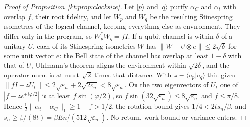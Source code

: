 \begin{proof}[Proof of Proposition~\ref{kt:prop:clocksize}]
Let $|p\rangle$ and $|q\rangle$ purify $\alpha_C$ and $\alpha_t$ with overlap $f$, their root fidelity, and let $W_p$ and $W_q$ be the resulting Stinespring isometries of the logical channel, keeping everything else as environment. They differ only in the program, so $W_p^*W_q=fI$. If a qubit channel is within $\delta$ of a unitary $U$, each of its Stinespring isometries $W$ has $\|W-U\otimes e\|\le2\sqrt\delta$ for some unit vector $e$: the Bell state of the channel has overlap at least $1-\delta$ with that of $U$, Uhlmann's theorem aligns the environment within $\sqrt{2\delta}$, and the operator norm is at most $\sqrt2$ times that distance. With $z=\langle e_p|e_q\rangle$ this gives $\|fI-zU_t\|\le2\sqrt{\varepsilon_n}+2\sqrt{2\varepsilon_n}<8\sqrt{\varepsilon_n}$. On the two eigenvectors of $U_t$ one of $|f-ze^{\pm i\varphi/2}|$ is at least $f\sin(\varphi/2)$, so $f\sin(32\sqrt{\varepsilon_n})\le8\sqrt{\varepsilon_n}$ and $f\le\pi/8$. Hence $\frac12\|\alpha_t-\alpha_C\|_1\ge1-f>1/2$, the rotation bound gives $1/4<2ts_n/\beta$, and $s_n\ge\beta/(8t)=\beta En/(512\sqrt{\varepsilon_n})$. No return, work bound or variance enters.


\end{proof}
